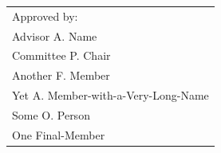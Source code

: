 \begin{titlepage}
\begin{center}
\begin{singlespace}
\end{singlespace}
\endgroup
\end{center}

% 
%
%
%
%
\vspace*{\dimexpr 1in-0.25\baselineskip\relax}
\noindent\hspace*{\dimexpr 0.667\textwidth - 1em\relax}%
\begin{tabular}[t]{@{}l@{}}
    Approved by:\\
    Advisor A. Name\\
    Committee P. Chair\\
    Another F. Member\\
    Yet A. Member-with-a-Very-Long-Name\\
    Some O. Person\\
    One Final-Member
    \end{tabular}
\end{titlepage}
